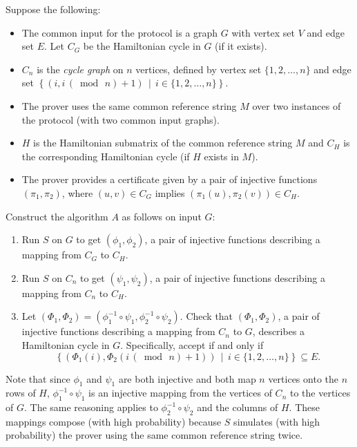 \documentclass[draft]{article}
\renewcommand{\pmod}[1]{\,(\bmod{\,#1})}
\begin{document}
\begin{enumerate}
  Suppose the following:
  \begin{itemize}
  \item The common input for the protocol is a graph $G$ with vertex set $V$ and edge set $E$.
    Let $C_G$ be the Hamiltonian cycle in $G$ (if it exists).
  \item $C_n$ is the \emph{cycle graph} on $n$ vertices, defined by vertex set $\{1, 2, \ldots, n\}$ and edge set $\left\{(i, i \pmod{n} + 1)\,\middle|\, i\in \{1, 2, \ldots, n\}\right\}$.
  \item The prover uses the same common reference string $M$ over two instances of the protocol (with two common input graphs).
  \item $H$ is the Hamiltonian submatrix of the common reference string $M$ and $C_H$ is the corresponding Hamiltonian cycle (if $H$ exists in $M$).
  \item The prover provides a certificate given by a pair of injective functions $(\pi_1, \pi_2)$, where $(u, v)\in C_G$ implies $(\pi_1(u), \pi_2(v))\in C_H$.
  \end{itemize}
  Construct the algorithm $A$ as follows on input $G$:
  \begin{enumerate}
  \item Run $S$ on $G$ to get $(\phi_1, \phi_2)$, a pair of injective functions describing a mapping from $C_G$ to $C_H$.
  \item Run $S$ on $C_n$ to get $(\psi_1, \psi_2)$, a pair of injective functions describing a mapping from $C_n$ to $C_H$.
  \item
    Let $(\Phi_1, \Phi_2)=(\phi_1^{-1}\circ\psi_1, \phi_2^{-1}\circ\psi_2)$.
    Check that $(\Phi_1, \Phi_2)$, a pair of injective functions describing a mapping from $C_n$ to $G$, describes a Hamiltonian cycle in $G$.
    Specifically, accept if and only if
    \begin{displaymath}
      \left\{(\Phi_1(i), \Phi_2(i \pmod{n} + 1)) \,\middle|\, i \in \{1, 2, \ldots, n\}\right\}\subseteq E.
    \end{displaymath}
  \end{enumerate}
  Note that since $\phi_1$ and $\psi_1$ are both injective and both map $n$ vertices onto the $n$ rows of $H$, $\phi_1^{-1}\circ\psi_1$ is an injective mapping from the vertices of $C_n$ to the vertices of $G$.
  The same reasoning applies to $\phi_2^{-1}\circ\psi_2$ and the columns of $H$.
  These mappings compose (with high probability) because $S$ simulates (with high probability) the prover using the same common reference string twice.


\end{enumerate}
\end{document}

